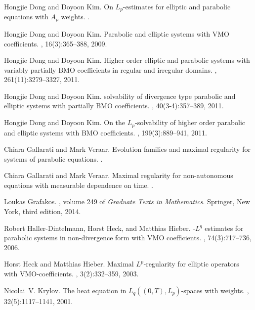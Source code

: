 \documentclass[reqno]{amsart}
\numberwithin{equation}{section}
\theoremstyle{plain}
\theoremstyle{definition}
\theoremstyle{remark}
\begin{document}
\begin{thebibliography}{10}
Hongjie Dong and Doyoon Kim.
\newblock On {$L_p$}-estimates for elliptic and parabolic equations with {$A_p$}
  weights.
.

Hongjie Dong and Doyoon Kim.
\newblock Parabolic and elliptic systems with {VMO} coefficients.
, 16(3):365--388, 2009.

Hongjie Dong and Doyoon Kim.
\newblock Higher order elliptic and parabolic systems with variably partially
  {BMO} coefficients in regular and irregular domains.
, 261(11):3279--3327, 2011.

Hongjie Dong and Doyoon Kim.
 solvability of divergence type parabolic and elliptic systems
  with partially {BMO} coefficients.
, 40(3-4):357--389,
  2011.

Hongjie Dong and Doyoon Kim.
\newblock On the {$L_p$}-solvability of higher order parabolic and elliptic
  systems with {BMO} coefficients.
, 199(3):889--941, 2011.

Chiara Gallarati and Mark Veraar.
\newblock Evolution families and maximal regularity for systems of parabolic
  equations.
.

Chiara Gallarati and Mark Veraar.
\newblock Maximal regularity for non-autonomous equations with measurable
  dependence on time.
.

Loukas Grafakos.
, volume 249 of {\em Graduate Texts
  in Mathematics}.
\newblock Springer, New York, third edition, 2014.

Robert Haller-Dintelmann, Horst Heck, and Matthias Hieber.
-{$L^q$} estimates for parabolic systems in non-divergence
  form with {VMO} coefficients.
, 74(3):717--736, 2006.

Horst Heck and Matthias Hieber.
\newblock Maximal ${L}^p$-regularity for elliptic operators with
  {VMO}-coefficients.
, 3(2):332--359, 2003.

Nicolai~V. Krylov.
\newblock The heat equation in ${L}_q((0,{T}),{L}_p)$-spaces with weights.
, 32(5):1117--1141, 2001.


\end{thebibliography}
\end{document}
